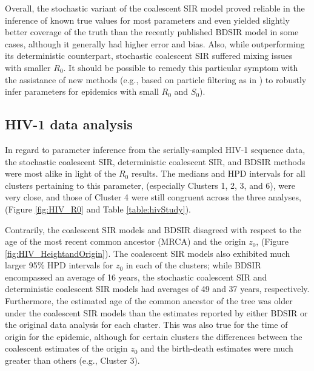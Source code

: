 \documentclass[12pt,titlepage]{article}
\newcommand{\stochCoalSIR}{stochastic coalescent SIR}
\newcommand{\deterCoalSIR}{deterministic coalescent SIR}
\newcommand{\stochSIR}{stochastic SIR}
\newcommand{\BDSIR}{BDSIR}
\begin{document}
Overall, the stochastic variant of the 
coalescent SIR model proved reliable in the inference of known true values 
for most parameters and even yielded slightly better coverage of the truth than the recently published 
\BDSIR{} \citep{Kuhnert:2014} model in some cases, although it generally had higher error and bias.  Also, while outperforming its deterministic counterpart, \stochCoalSIR{} suffered mixing issues with smaller $R_0$.  
It should be possible to remedy this particular symptom with the assistance of new methods (e.g., based on particle filtering as in \cite{Rasmussen2014}) to robustly infer parameters for epidemics with small $R_0$ and $S_0$).





\subsection{HIV-1 data analysis}  

In regard to parameter inference from the serially-sampled HIV-1 sequence data, the \stochCoalSIR{}, \deterCoalSIR{}, and \BDSIR{} methods were most alike in 
light of the $R_{0}$ results.  The medians and HPD intervals for all clusters pertaining to this parameter,
(especially Clusters 1, 2, 3, and 6), were very close, and those of Cluster 4 were still congruent across the three analyses, (Figure \ref{fig:HIV_R0} and Table \ref{table:hivStudy}).  

Contrarily, the coalescent SIR models and BDSIR disagreed with respect to the age of the most recent common ancestor (MRCA) and the origin $z_0$, (Figure \ref{fig:HIV_HeightandOrigin}).  The coalescent SIR models also exhibited much larger 95\% HPD intervals for $z_0$ in each of the clusters; 
while BDSIR encompassed an average of 16 years, the \stochCoalSIR{} and \deterCoalSIR{} models had averages of 49 and 37 years, respectively.   
Furthermore, the estimated age of the common ancestor of the tree was older under the coalescent SIR
models than the estimates reported by either \BDSIR{} or the original data analysis \citep{Hue:2005} for each cluster.  This was also true for the time of origin for the epidemic, 
although for certain clusters the differences between the coalescent estimates of the origin $z_0$ and the birth-death estimates were much greater than others (e.g., Cluster 3).   
\end{document}
